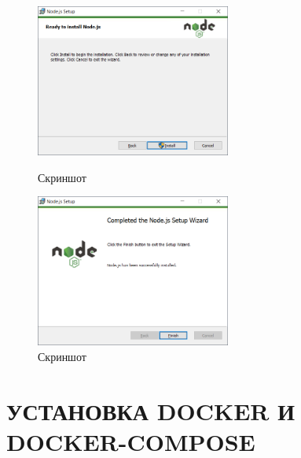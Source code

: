 \begin{figure}[!phtb]
    \centering

    \begin{minipage}{0.49\textwidth}
        \centering

        \includegraphics[height=5cm]
        {images/install/node-js/7.png}

        \caption{Скриншот}

        \label{fig:nodejs_7}
    \end{minipage}
    \begin{minipage}{0.49\textwidth}
        \centering

        \includegraphics[height=5cm]
        {images/install/node-js/8.png}

        \caption{Скриншот}

        \label{fig:nodejs_8}
    \end{minipage}
\end{figure}

\newpage
\section{УСТАНОВКА DOCKER И DOCKER-COMPOSE}

